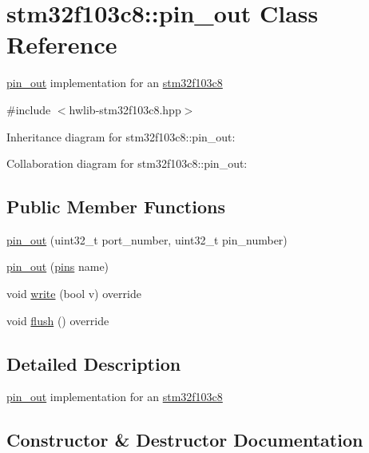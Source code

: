 \hypertarget{classstm32f103c8_1_1pin__out}{}\section{stm32f103c8\+:\+:pin\+\_\+out Class Reference}
\label{classstm32f103c8_1_1pin__out}


\hyperlink{classstm32f103c8_1_1pin__out}{pin\+\_\+out} implementation for an \hyperlink{namespacestm32f103c8}{stm32f103c8}  




{\ttfamily \#include $<$hwlib-\/stm32f103c8.\+hpp$>$}



Inheritance diagram for stm32f103c8\+:\+:pin\+\_\+out\+:


Collaboration diagram for stm32f103c8\+:\+:pin\+\_\+out\+:
\subsection*{Public Member Functions}
\begin{DoxyCompactItemize}
\item 
\hyperlink{classstm32f103c8_1_1pin__out_a4a2fe51a52b60eaf8f060273bdc133ac}{pin\+\_\+out} (uint32\+\_\+t port\+\_\+number, uint32\+\_\+t pin\+\_\+number)
\item 
\hyperlink{classstm32f103c8_1_1pin__out_ad226a64af3c8204040694b8d8c634b1d}{pin\+\_\+out} (\hyperlink{namespacestm32f103c8_a69d642506db309a7e64295d35ec21ff6}{pins} name)
\item 
void \hyperlink{classstm32f103c8_1_1pin__out_af1d21fc8d9b0d8dc2c4b5e9aadef12f5}{write} (bool v) override
\item 
void \hyperlink{classstm32f103c8_1_1pin__out_a401a547302edb7ceb655e5d4be0af6a8}{flush} () override
\end{DoxyCompactItemize}


\subsection{Detailed Description}
\hyperlink{classstm32f103c8_1_1pin__out}{pin\+\_\+out} implementation for an \hyperlink{namespacestm32f103c8}{stm32f103c8} 

\subsection{Constructor \& Destructor Documentation}
\mbox{\label{classstm32f103c8_1_1pin__out_a4a2fe51a52b60eaf8f060273bdc133ac}} 
